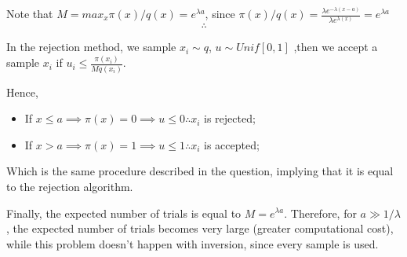 \documentclass[12pt,letterpaper]{article}
\begin{document}
\begin{enumerate}[leftmargin=!,labelindent=5pt]
    Note that $M = max_x\pi(x)/q(x) = e^{\lambda a}$, since
    $\pi(x)/q(x)
    = \frac{\lambda e^{-\lambda (x-a)}}{\lambda e^{\lambda (x)}}=
    e^{\lambda a}$
    $$\therefore$$

    In the rejection method, we sample $x_i \sim q$, $u \sim Unif[0,1]$
    ,then we accept a sample $x_i$ if
    $u_i \leq \frac{\pi(x_i)}{Mq(x_i)}$. 

    Hence,
    \begin{itemize}
    	\item If $x \leq a \implies \pi(x) = 0 \implies
    	u \leq 0 \therefore x_i$ is rejected;
    	\item If $x > a \implies \pi(x) = 1
    	\implies u \leq 1 \therefore x_i$ is accepted;
    \end{itemize}

    Which is the same procedure described in the question, implying that
    it is equal to the rejection algorithm.

    Finally, the expected number of trials is equal to $M = e^{\lambda a}$.
    Therefore, for $a \gg 1/\lambda$, the expected number of trials becomes 
    very large (greater computational cost), while this problem doesn't
    happen with inversion, since every sample is used.

\end{enumerate}

\newpage
\end{document}
